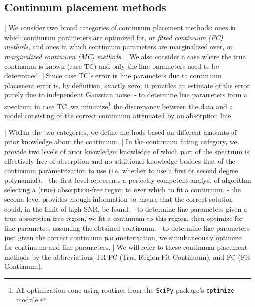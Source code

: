 \documentclass[trackchanges]{aastex62}
\begin{document}
{\color{red} \bf
\subsection{Continuum placement methods}
\label{sec:artificial-tests:continuum-placement-methods}
| We consider two broad categories of continuum placement methods: ones in which continuum parameters are optimized for, or \emph{fitted continuum (FC) methods}, and ones in which continuum parameters are marginalized over, or \emph{marginalized continuum (MC) methods}.
| We also consider a case where the true continuum is known (case TC) and only the line parameters need to be determined.
| Since case TC's error in line parameters due to continuum placement error is, by definition, exactly zero, it provides an estimate of the error purely due to independent Gaussian noise.
- to determine line parameters from a spectrum in case TC, we minimize\footnote{All optimization done using routines from the \texttt{SciPy} package's \texttt{optimize} module.} the discrepancy between the data and a model consisting of the correct continuum attenuated by an absorption line.

| Within the two categories, we define methods based on different amounts of prior knowledge about the continuum.
| In the continuum fitting category, we provide two levels of prior knowledge: knowledge of which part of the spectrum is effectively free of absorption and no additional knowledge besides that of the continuum parametrization to use (i.e. whether to use a first or second degree polynomial).
- the first level represents a perfectly competent analyst of algorithm selecting a (true) absorption-free region to over which to fit a continuum.
- the second level provides enough information to ensure that the correct solution could, in the limit of high SNR, be found.
- to determine line parameters given a true absorption-free region, we fit a continuum to this region, then optimize for line parameters assuming the obtained continuum.
- to determine line parameters just given the correct continuum parameterization, we simultaneously optimize for continuum and line parameters.
| We will refer to these continuum placement methods by the abbreviations TR-FC (True Region-Fit Continuum), and FC (Fit Continuum).

}
\end{document}
